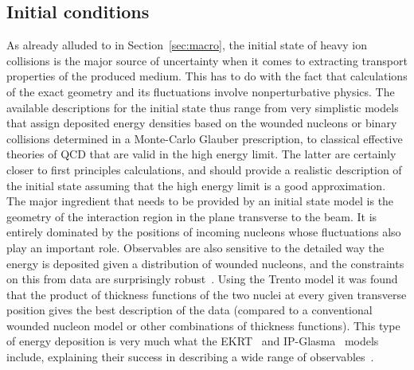 



\subsection{Initial conditions} \label{sec:initialstate}
As already alluded to in Section~\ref{sec:macro}, the initial state of 
  heavy ion collisions is the major source of uncertainty when it comes 
  to extracting transport properties of the produced medium. 
This has to do with the fact that calculations of the exact geometry and 
  its fluctuations involve nonperturbative physics. 
The available descriptions for the initial state thus range from very 
  simplistic models that assign deposited energy densities based on the 
  wounded nucleons or binary collisions determined in a Monte-Carlo 
  Glauber prescription, to classical effective theories of QCD that are 
  valid in the high energy limit. 
The latter are certainly closer to first principles calculations, and 
  should provide a realistic description of the initial state assuming 
  that the high energy limit is a good approximation.
The major ingredient that needs to be provided by an initial state model 
  is the geometry of the interaction region in the plane transverse 
  to the beam. 
It is entirely dominated by the positions of incoming nucleons whose 
  fluctuations also play an important role. 
Observables are also sensitive to the detailed way the energy is deposited 
  given a distribution of wounded nucleons, and the constraints on this 
  from data are surprisingly robust~\cite{Moreland:2018gsh}. 
Using the Trento model it was found that the product of thickness functions 
  of the two nuclei at every given transverse position gives the best description 
  of the data (compared to a conventional wounded nucleon model or other 
  combinations of thickness functions). 
This type of energy deposition is very much what the EKRT~\cite{Niemi:2015qia} 
  and IP-Glasma~\cite{Schenke:2012wb,Schenke:2012fw} models include, explaining 
  their success in describing a wide range of observables~\cite{Niemi:2015qia,Gale:2012rq}.
